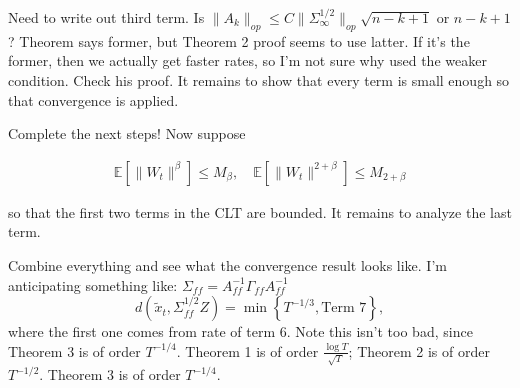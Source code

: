 {\color{red}Need to write out third term.
Is $\lVert A_k \rVert_{op} \leq C \lVert \Sigma_{\infty}^{1/2} \rVert_{op} \sqrt{n -k +1}$ or $n -k +1$? Theorem says former, but Theorem 2 proof seems to use latter.  
If it's the former, then we actually get faster rates, so I'm not sure why \citep{srikant2024CLT} used the weaker condition. Check his proof. 
}
It remains to show that every term is small enough so that convergence is applied.

{\color{blue}Complete the next steps!}
Now suppose
\begin{assumption}
    \begin{align*}
        \mathbb{E}[\lVert W_t \rVert^{\beta}] \leq M_{\beta} , \quad
        \mathbb{E}[\lVert W_t \rVert^{2+\beta}] \leq M_{2+\beta}         
    \end{align*} 
\end{assumption}
so that the first two terms in the CLT are bounded. 
It remains to analyze the last term. 




{\color{blue}Combine everything and see what the convergence result looks like.
I'm anticipating something like:
}
$\Sigma_{ff} = A_{ff}^{-1} \Gamma_{ff} A_{ff}^{-1}$
\begin{equation}
    d(\tilde{x}_t, \Sigma_{ff}^{1/2} Z) = \min \left\{T^{-1/3}, \text{Term 7} \right\},
\end{equation}
where the first one comes from rate of term 6. 
Note this isn't too bad, since \citep{srikant2024CLT} Theorem 3 is of order $T^{-1/4}$.
{\color{blue}
    Theorem 1 is of order $\frac{\log T}{\sqrt{T}}$; Theorem 2 is of order $T^{-1/2}$.
    Theorem 3 is of order $T^{-1/4}$.
}


